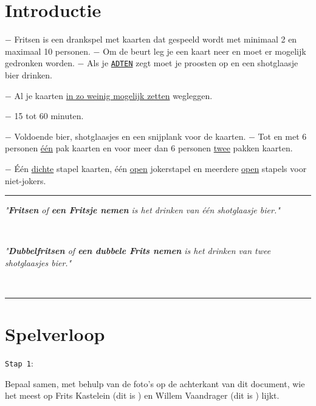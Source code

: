 \vspace{-0.5cm}
\section*{Introductie}
$-$ Fritsen is een drankspel met kaarten dat gespeeld wordt met minimaal 2 en maximaal 10 personen. \newline $-$ Om de beurt leg je een kaart neer en moet er mogelijk gedronken worden. \newline $-$ Als je \ul{\texttt{ADTEN}} zegt moet je proosten op  en een shotglaasje bier drinken. 
\vspace*{-0.22cm} 

$-$ Al je kaarten \ul{in zo weinig mogelijk zetten} wegleggen.

\vspace*{-0.22cm} 

$-$ 15 tot 60 minuten.

\vspace*{-0.22cm} 

$-$ Voldoende bier, shotglaasjes en een snijplank voor de kaarten. \newline $-$ Tot en met 6 personen \ul{\'e\'en} pak kaarten en voor meer dan 6 personen \ul{twee} pakken kaarten.

\vspace*{-0.22cm} 

$-$ \'E\'en \ul{dichte} stapel kaarten, \'e\'en \ul{open} jokerstapel en meerdere \ul{open} stapels voor niet-jokers.

\noindent\rule{\textwidth}{1pt}
\centerline{\textit{"\textbf{Fritsen} of \textbf{een Fritsje nemen} is het drinken van één shotglaasje bier."}} \\
\centerline{\textit{"\textbf{Dubbelfritsen} of \textbf{een dubbele Frits nemen} is het drinken van twee shotglaasjes bier."}} \vspace*{-0.7cm}  \\
\noindent\rule{\textwidth}{1pt}

\vspace*{-0.45cm}

\section*{Spelverloop}
\label{sec:introductie}
\begin{minipage}[t]{.09\textwidth}
\texttt{Stap 1}:
\end{minipage}
\hfill
\begin{minipage}[t]{.91\textwidth}
Bepaal samen, met behulp van de foto's op de achterkant van dit document, wie het meest op Frits Kastelein (dit is \FritsN) en Willem Vaandrager (dit is \WillemN
) lijkt. \\
\end{minipage}

